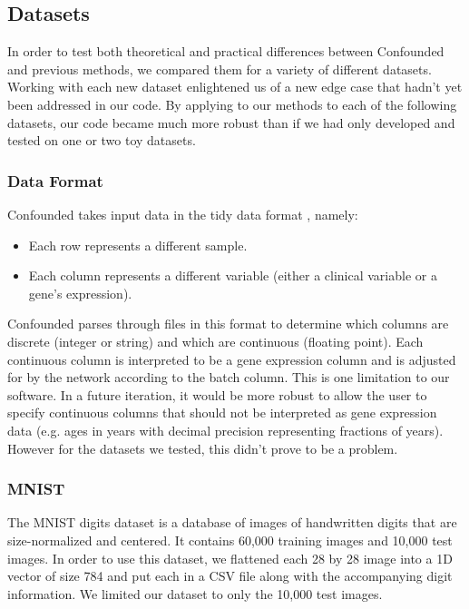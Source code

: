 \documentclass[notitlepage]{article}
\begin{document}
\subsection{Datasets}

In order to test both theoretical and practical differences between Confounded and previous methods, we compared them for a variety of different datasets.
Working with each new dataset enlightened us of a new edge case that hadn't yet been addressed in our code.
By applying to our methods to each of the following datasets, our code became much more robust than if we had only developed and tested on one or two toy datasets.

\subsubsection{Data Format}

Confounded takes input data in the tidy data format \cite{wickham_tidy_2014-1}, namely:

\begin{itemize}
	\item Each row represents a different sample.
	\item Each column represents a different variable (either a clinical variable or a gene's expression).
\end{itemize}

Confounded parses through files in this format to determine which columns are discrete (integer or string) and which are continuous (floating point).
Each continuous column is interpreted to be a gene expression column and is adjusted for by the network according to the batch column.
This is one limitation to our software.
In a future iteration, it would be more robust to allow the user to specify continuous columns that should not be interpreted as gene expression data (e.g. ages in years with decimal precision representing fractions of years).
However for the datasets we tested, this didn't prove to be a problem.

\subsubsection{MNIST}

The MNIST digits dataset \cite{lecun_mnist_nodate} is a database of images of handwritten digits that are size-normalized and centered.
It contains 60,000 training images and 10,000 test images.
In order to use this dataset, we flattened each 28 by 28 image into a 1D vector of size 784 and put each in a CSV file along with the accompanying digit information.
We limited our dataset to only the 10,000 test images.
\end{document}
